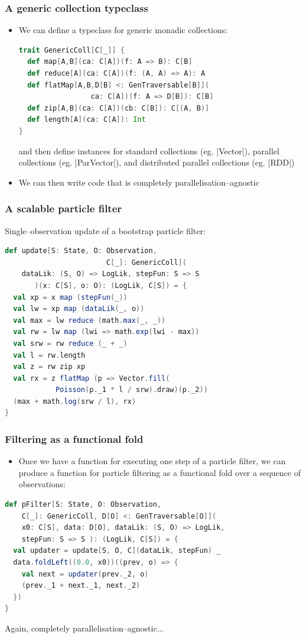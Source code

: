 \documentclass[mathserif,handout]{beamer}
\begin{document}
\begin{frame}[fragile]
  \frametitle{A generic collection typeclass}
  \begin{itemize}
  \item We can define a typeclass for generic monadic collections:
\begin{lstlisting}[language=scala]
trait GenericColl[C[_]] {
  def map[A,B](ca: C[A])(f: A => B): C[B]
  def reduce[A](ca: C[A])(f: (A, A) => A): A
  def flatMap[A,B,D[B] <: GenTraversable[B]](
                 ca: C[A])(f: A => D[B]): C[B]
  def zip[A,B](ca: C[A])(cb: C[B]): C[(A, B)]
  def length[A](ca: C[A]): Int
}
\end{lstlisting}
and then define instances for standard collections (eg. |Vector|), parallel collections (eg. |ParVector|), and distributed parallel collections (eg. |RDD|)
\item We can then write code that is completely \alert{parallelisation--agnostic}
  \end{itemize}
\end{frame}

\begin{frame}[fragile]
  \frametitle{A scalable particle filter}
Single--observation update of a bootstrap particle filter:
\begin{lstlisting}[language=scala]
def update[S: State, O: Observation,
                        C[_]: GenericColl](
    dataLik: (S, O) => LogLik, stepFun: S => S
       )(x: C[S], o: O): (LogLik, C[S]) = {
  val xp = x map (stepFun(_))
  val lw = xp map (dataLik(_, o))
  val max = lw reduce (math.max(_, _))
  val rw = lw map (lwi => math.exp(lwi - max))
  val srw = rw reduce (_ + _)
  val l = rw.length
  val z = rw zip xp
  val rx = z flatMap (p => Vector.fill(
            Poisson(p._1 * l / srw).draw)(p._2))
  (max + math.log(srw / l), rx)
}  
\end{lstlisting}
\end{frame}

\begin{frame}[fragile]
  \frametitle{Filtering as a functional fold}
  \begin{itemize}
  \item Once we have a function for executing one step of a particle filter, we can produce a function for particle filtering as a functional fold over a sequence of observations:
  \end{itemize}
\begin{lstlisting}[language=scala]
def pFilter[S: State, O: Observation,
    C[_]: GenericColl, D[O] <: GenTraversable[O]](
    x0: C[S], data: D[O], dataLik: (S, O) => LogLik,
    stepFun: S => S ): (LogLik, C[S]) = {
  val updater = update[S, O, C](dataLik, stepFun) _
  data.foldLeft((0.0, x0))((prev, o) => {
    val next = updater(prev._2, o)
    (prev._1 + next._1, next._2)
  })
}
\end{lstlisting}
Again, completely parallelisation--agnostic...
\end{frame}
\end{document}
